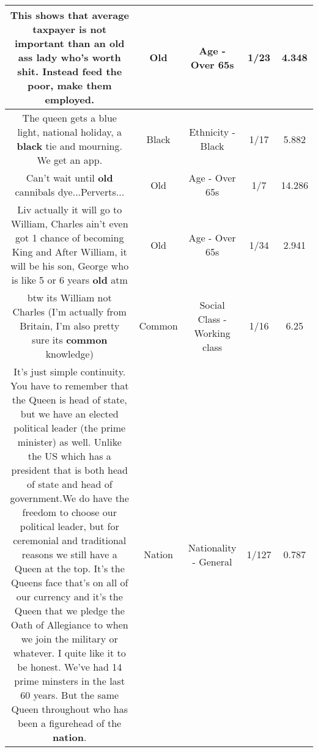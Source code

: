 \documentclass[11pt]{article}
\newlength\mylength
\begin{document}
\begin{center}
\begin{longtable}{|C{.65\mylength}|C{.30\mylength}|C{.12\mylength}|C{.12\mylength}|C{.12\mylength}|}
  \small This shows that average taxpayer is not important than an \textbf{old} ass lady who's worth shit. Instead feed the poor, make them employed.\normalsize   & Old & Age - Over 65s & 1/23 & 4.348 \\  \hline
  \small The queen gets a blue light, national holiday, a \textbf{black} tie and mourning. We get an app.\normalsize   & Black & Ethnicity - Black & 1/17 & 5.882 \\  \hline
  \small Can't wait until \textbf{old} cannibals dye...Perverts...\normalsize   & Old & Age - Over 65s & 1/7 & 14.286 \\  \hline
  \small Liv actually it will go to William, Charles ain't even got 1 chance of becoming King and After William, it will be his son, George who is like 5 or 6 years \textbf{old} atm\normalsize   & Old & Age - Over 65s & 1/34 & 2.941 \\  \hline
  \small btw its William not Charles (I'm actually from Britain, I'm also pretty sure its \textbf{common} knowledge)\normalsize   & Common & Social Class - Working class & 1/16 & 6.25 \\  \hline
  \small It's just simple continuity. You have to remember that the Queen is head of state, but we have an elected political leader (the prime minister) as well.  Unlike the US which has a president that is both head of state and head of government.We do have the freedom to choose our political leader, but for ceremonial and traditional reasons we still have a Queen at the top. It's the Queens face that's on all of our currency and it's the Queen that we pledge the Oath of Allegiance to when we join the military or whatever. I quite like it to be honest. We've had 14 prime minsters in the last 60 years. But the same Queen throughout who has been a figurehead of the \textbf{nation}.\normalsize   & Nation & Nationality - General & 1/127 & 0.787 \\  \hline

\end{longtable}
\end{center}
\end{document}
